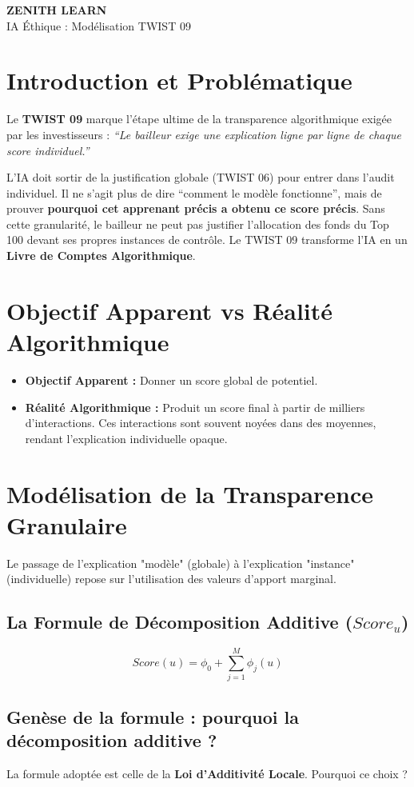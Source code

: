 \documentclass[11pt,a4paper]{article}
\newcommand{\makebrandtitle}{
    \begin{tcolorbox}[enhanced, colback=BrandDark, colframe=BrandPrimary, arc=10pt, boxrule=2pt, halign=center]
        \vspace{0.3cm}
        {\Huge \bfseries \color{white} ZENITH LEARN} \\
        \vspace{0.2cm}
        {\Large \color{BrandPrimary} IA Éthique : Modélisation TWIST 09} \\
        \vspace{0.3cm}
    \end{tcolorbox}
    \vspace{0.5cm}
}
\begin{document}
\makebrandtitle

\section{Introduction et Problématique}
Le \textbf{TWIST 09} marque l'étape ultime de la transparence algorithmique exigée par les investisseurs : \textit{``Le bailleur exige une explication ligne par ligne de chaque score individuel.''} 

L'IA doit sortir de la justification globale (TWIST 06) pour entrer dans l'audit individuel. Il ne s'agit plus de dire ``comment le modèle fonctionne'', mais de prouver \textbf{pourquoi cet apprenant précis a obtenu ce score précis}. Sans cette granularité, le bailleur ne peut pas justifier l'allocation des fonds du Top 100 devant ses propres instances de contrôle. Le TWIST 09 transforme l'IA en un \textbf{Livre de Comptes Algorithmique}.

\section{Objectif Apparent vs Réalité Algorithmique}
\begin{itemize}
    \item \textbf{Objectif Apparent :} Donner un score global de potentiel.
    \item \textbf{Réalité Algorithmique :} Produit un score final à partir de milliers d'interactions. Ces interactions sont souvent noyées dans des moyennes, rendant l'explication individuelle opaque.
\end{itemize}

\section{Modélisation de la Transparence Granulaire}
Le passage de l'explication "modèle" (globale) à l'explication "instance" (individuelle) repose sur l'utilisation des valeurs d'apport marginal.

\subsection{La Formule de Décomposition Additive ($Score_u$)}
\begin{equation}
Score(u) = \phi_0 + \sum_{j=1}^{M} \phi_j(u)
\end{equation}

\subsection{Genèse de la formule : pourquoi la décomposition additive ?}
La formule adoptée est celle de la \textbf{Loi d'Additivité Locale}. Pourquoi ce choix ? 
\end{document}

